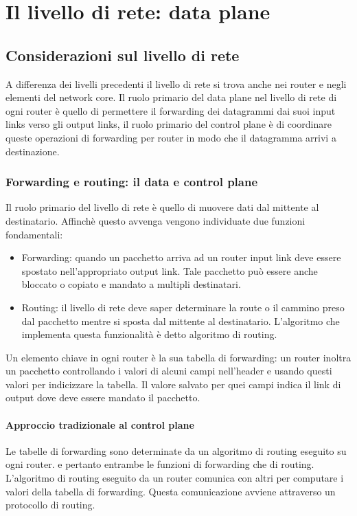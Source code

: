 	\chapter{Il livello di rete: data plane}
\section{Considerazioni sul livello di rete}
A differenza dei livelli precedenti il livello di rete si trova anche nei router e negli elementi del network core. Il ruolo primario del data plane nel 
livello di rete di ogni router \`e quello di permettere il forwarding dei datagrammi dai suoi input links verso gli output links, il ruolo primario del 
control plane \`e di coordinare queste operazioni di forwarding per router in modo che il datagramma arrivi a destinazione. 
\subsection{Forwarding e routing: il data e control plane}
Il ruolo primario del livello di rete \`e quello di muovere dati dal mittente al destinatario. Affinch\`e questo avvenga vengono individuate due funzioni
fondamentali: 
\begin{itemize}
\item Forwarding: quando un pacchetto arriva ad un router input link deve essere spostato nell'appropriato output link. Tale pacchetto pu\`o essere anche 
bloccato o copiato e mandato a multipli destinatari.
\item Routing: il livello di rete deve saper determinare la route o il cammino preso dal pacchetto mentre si sposta dal mittente al destinatario. 
L'algoritmo che implementa questa funzionalit\`a \`e detto algoritmo di routing.
\end{itemize}
Un elemento chiave in ogni router \`e la sua tabella di forwarding: un router inoltra un pacchetto controllando i valori di alcuni campi nell'header e 
usando questi valori per indicizzare la tabella. Il valore salvato per quei campi indica il link di output dove deve essere mandato il pacchetto. 
\subsubsection{Approccio tradizionale al control plane}
Le tabelle di forwarding sono determinate da un algoritmo di routing eseguito su ogni router. e pertanto entrambe le funzioni di forwarding che di
routing. L'algoritmo di routing eseguito da un router comunica con altri per computare i valori della tabella di 
forwarding. Questa comunicazione avviene attraverso un protocollo di routing. 
